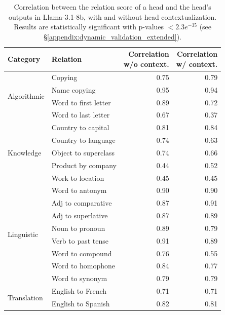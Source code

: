 \documentclass[11pt]{article}
\begin{document}
\begin{table}[t]
\setlength\belowcaptionskip{-8px}
\setlength{\tabcolsep}{2pt}
\centering
\footnotesize
\begin{tabular}{llrr}
\toprule
Category & Relation & \makecell{Correlation\\w/o context.} & \makecell{Correlation\\w/ context.} \\
\midrule
\multirow{4}{*}{Algorithmic} & Copying & 0.75 & 0.79 \\
 & Name copying & 0.95 & 0.94 \\
 & Word to first letter & 0.89 & 0.72 \\
 & Word to last letter & 0.67 & 0.37 \\
 \midrule
\multirow{5}{*}{Knowledge} & Country to capital & 0.81 & 0.84 \\
 & Country to language & 0.74 & 0.63 \\
 & Object to superclass & 0.74 & 0.66 \\
 & Product by company & 0.44 & 0.52 \\
 & Work to location & 0.45 & 0.45 \\
\midrule
\multirow{8}{*}{Linguistic}
 & Word to antonym & 0.90 & 0.90 \\
 & Adj to comparative & 0.87 & 0.91 \\
 & Adj to superlative & 0.87 & 0.89 \\
 & Noun to pronoun & 0.89 & 0.79 \\
 & Verb to past tense & 0.91 & 0.89 \\
 & Word to compound & 0.76 & 0.55 \\
 & Word to homophone & 0.84 & 0.77 \\
 & Word to synonym & 0.79 & 0.79 \\
 \midrule
\multirow{2}{*}{Translation} & English to French & 0.71 & 0.71 \\
 & English to Spanish & 0.82 & 0.81 \\
\bottomrule
\end{tabular}
\caption{Correlation between the relation score of a head and the head's outputs in Llama-3.1-8b, with and without head contextualization. Results are statistically significant with p-values $< 2.3e^{-35}$ (see  \S\ref{appendix:dynamic_validation_extended}).} 
\label{tab:Dynamic results}
\end{table}
\end{document}
